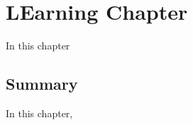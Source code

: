 \chapter{LEarning Chapter}\label{cha:PCTLKC+}

In this chapter

\section{Summary}\label{sec:conclusion}

In this chapter, 